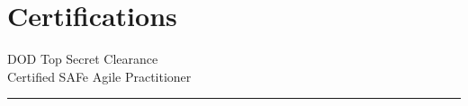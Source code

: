 \documentclass[letterpaper]{deedy-resume}
\begin{document}
\begin{minipage}[t]{0.3\textwidth}
\section{Certifications}

\vspace{1em}

\textbullet{} DOD Top Secret Clearance\\
\textbullet{} Certified SAFe\textregistered{} Agile Practitioner\\
\sectionspace
\vspace{-1ex}
\rule{5cm}{0.5pt}









\end{minipage}
\end{document}

